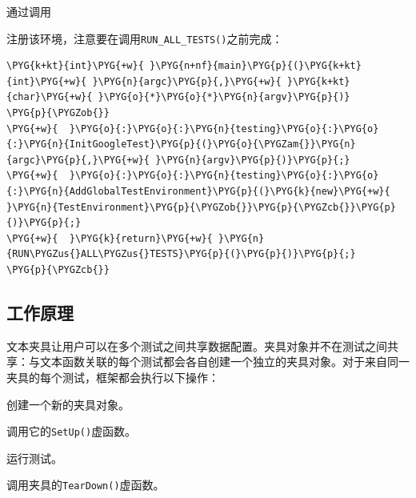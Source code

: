 
通过调用



注册该环境，注意要在调用\texttt{RUN\_\allowbreak{}ALL\_\allowbreak{}TESTS()}之前完成：



\begin{codeblockbg}
\begin{Verbatim}[commandchars=\\\{\},breaklines=true,breakanywhere=true,fontsize=\codefont,xleftmargin=17bp]
\PYG{k+kt}{int}\PYG{+w}{ }\PYG{n+nf}{main}\PYG{p}{(}\PYG{k+kt}{int}\PYG{+w}{ }\PYG{n}{argc}\PYG{p}{,}\PYG{+w}{ }\PYG{k+kt}{char}\PYG{+w}{ }\PYG{o}{*}\PYG{o}{*}\PYG{n}{argv}\PYG{p}{)}
\PYG{p}{\PYGZob{}}
\PYG{+w}{  }\PYG{o}{:}\PYG{o}{:}\PYG{n}{testing}\PYG{o}{:}\PYG{o}{:}\PYG{n}{InitGoogleTest}\PYG{p}{(}\PYG{o}{\PYGZam{}}\PYG{n}{argc}\PYG{p}{,}\PYG{+w}{ }\PYG{n}{argv}\PYG{p}{)}\PYG{p}{;}
\PYG{+w}{  }\PYG{o}{:}\PYG{o}{:}\PYG{n}{testing}\PYG{o}{:}\PYG{o}{:}\PYG{n}{AddGlobalTestEnvironment}\PYG{p}{(}\PYG{k}{new}\PYG{+w}{ }\PYG{n}{TestEnvironment}\PYG{p}{\PYGZob{}}\PYG{p}{\PYGZcb{}}\PYG{p}{)}\PYG{p}{;}
\PYG{+w}{  }\PYG{k}{return}\PYG{+w}{ }\PYG{n}{RUN\PYGZus{}ALL\PYGZus{}TESTS}\PYG{p}{(}\PYG{p}{)}\PYG{p}{;}
\PYG{p}{\PYGZcb{}}
\end{Verbatim}
\end{codeblockbg}



\subsection{工作原理}



文本夹具让用户可以在多个测试之间共享数据配置。夹具对象并不在测试之间共享：与文本函数关联的每个测试都会各自创建一个独立的夹具对象。对于来自同一夹具的每个测试，框架都会执行以下操作：



创建一个新的夹具对象。



调用它的\texttt{SetUp()}虚函数。



运行测试。



调用夹具的\texttt{TearDown()}虚函数。



